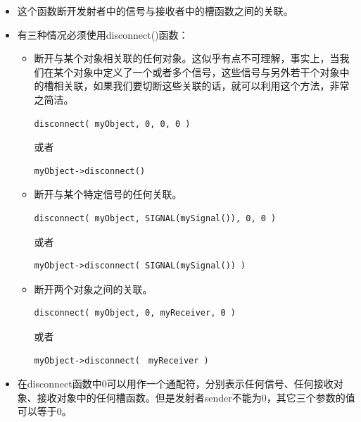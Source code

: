 \documentclass[9pt,b5paper]{article}
\begin{document}
\begin{itemize}
\item 这个函数断开发射者中的信号与接收者中的槽函数之间的关联。
\item 有三种情况必须使用disconnect()函数：
\begin{itemize}
\item 断开与某个对象相关联的任何对象。这似乎有点不可理解，事实上，当我们在某个对象中定义了一个或者多个信号，这些信号与另外若干个对象中的槽相关联，如果我们要切断这些关联的话，就可以利用这个方法，非常之简洁。
\lstset{language=java,label= ,caption= ,numbers=none}
\begin{lstlisting}
disconnect( myObject, 0, 0, 0 )
\end{lstlisting}

或者
\lstset{language=java,label= ,caption= ,numbers=none}
\begin{lstlisting}
myObject->disconnect()
\end{lstlisting}
\item 断开与某个特定信号的任何关联。
\lstset{language=java,label= ,caption= ,numbers=none}
\begin{lstlisting}
disconnect( myObject, SIGNAL(mySignal()), 0, 0 )
\end{lstlisting}

或者

\lstset{language=java,label= ,caption= ,numbers=none}
\begin{lstlisting}
myObject->disconnect( SIGNAL(mySignal()) )
\end{lstlisting}
\item 断开两个对象之间的关联。
\lstset{language=java,label= ,caption= ,numbers=none}
\begin{lstlisting}
disconnect( myObject, 0, myReceiver, 0 )
\end{lstlisting}
或者
\lstset{language=java,label= ,caption= ,numbers=none}
\begin{lstlisting}
myObject->disconnect(　myReceiver )
\end{lstlisting}
\end{itemize}
\item 在disconnect函数中0可以用作一个通配符，分别表示任何信号、任何接收对象、接收对象中的任何槽函数。但是发射者sender不能为0，其它三个参数的值可以等于0。
\end{itemize}
\end{document}
